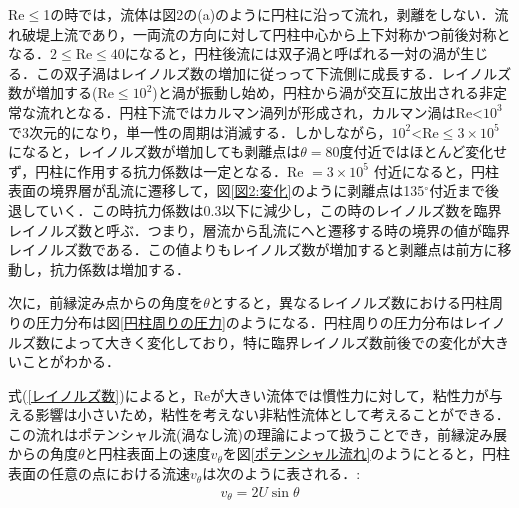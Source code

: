 \documentclass[a4paper,11pt,uplatex]{jsarticle}
\begin{document}
\newpage
Re$\leq$1の時では，流体は図2の(a)のように円柱に沿って流れ，剥離をしない．流れ破堤上流であり，一両流の方向に対して円柱中心から上下対称かつ前後対称となる．$2\leq$Re$\leq40$になると，円柱後流には双子渦と呼ばれる一対の渦が生じる．この双子渦はレイノルズ数の増加に従っって下流側に成長する．レイノルズ数が増加する(Re$\leq10^2$)と渦が振動し始め，円柱から渦が交互に放出される非定常な流れとなる．円柱下流ではカルマン渦列が形成され，カルマン渦はRe<$10^3$で3次元的になり，単一性の周期は消滅する．しかしながら，$10^2$<Re$\leq 3 \times 10^5$になると，レイノルズ数が増加しても剥離点は$\theta = 80$度付近ではほとんど変化せず，円柱に作用する抗力係数は一定となる．Re $ =3 \times 10^5$ 付近になると，円柱表面の境界層が乱流に遷移して，図\ref{図2:変化}のように剥離点は135$^\circ$付近まで後退していく．この時抗力係数は0.3以下に減少し，この時のレイノルズ数を臨界レイノルズ数と呼ぶ．つまり，層流から乱流にへと遷移する時の境界の値が臨界レイノルズ数である．この値よりもレイノルズ数が増加すると剥離点は前方に移動し，抗力係数は増加する．
\par
次に，前縁淀み点からの角度を$\theta$とすると，異なるレイノルズ数における円柱周りの圧力分布は図\ref{円柱周りの圧力}のようになる．円柱周りの圧力分布はレイノルズ数によって大きく変化しており，特に臨界レイノルズ数前後での変化が大きいことがわかる．
\par
式(\ref{レイノルズ数})によると，Reが大きい流体では慣性力に対して，粘性力が与える影響は小さいため，粘性を考えない非粘性流体として考えることができる．
この流れはポテンシャル流(渦なし流)の理論によって扱うことでき，前縁淀み展からの角度$\theta$と円柱表面上の速度$v_{\theta}$を図\ref{ポテンシャル流れ}のようにとると，円柱表面の任意の点における流速$v_{\theta}$は次のように表される．\cite{s4}:
\begin{align}
  v_{\theta} = 2U\sin \theta
\end{align}
\end{document}
